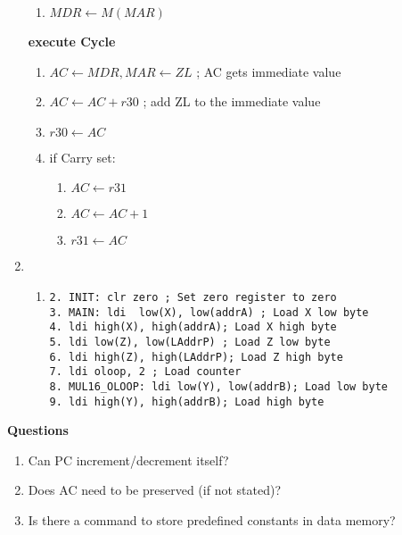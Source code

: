 \documentclass{article}
\begin{document}
\begin{enumerate}
\begin{enumerate}
        \item $MDR \leftarrow M(MAR)$
        \end{enumerate}
      \textbf{execute Cycle}\begin{enumerate}
        \item $AC \leftarrow MDR, MAR \leftarrow ZL$ ; AC gets immediate value
        \item $AC \leftarrow AC + r30$ ; add ZL to the immediate value
        \item $r30 \leftarrow AC$
        \item if Carry set:\begin{enumerate}
          \item $AC \leftarrow r31$
          \item $AC \leftarrow AC + 1$
          \item $r31 \leftarrow AC$
          \end{enumerate}
        \end{enumerate}
    \item\begin{enumerate}
      \item\begin{verbatim}
2. INIT: clr zero ; Set zero register to zero
3. MAIN: ldi  low(X), low(addrA) ; Load X low byte
4. ldi high(X), high(addrA); Load X high byte
5. ldi low(Z), low(LAddrP) ; Load Z low byte
6. ldi high(Z), high(LAddrP); Load Z high byte
7. ldi oloop, 2 ; Load counter
8. MUL16_OLOOP: ldi low(Y), low(addrB); Load low byte
9. ldi high(Y), high(addrB); Load high byte
        \end{verbatim}
      \end{enumerate}
  \end{enumerate}
  \textbf{Questions}\begin{enumerate}
    \item Can PC increment/decrement itself?
    \item Does AC need to be preserved (if not stated)?
    \item Is there a command to store predefined constants in data memory?
    \end{enumerate}
\end{document}

